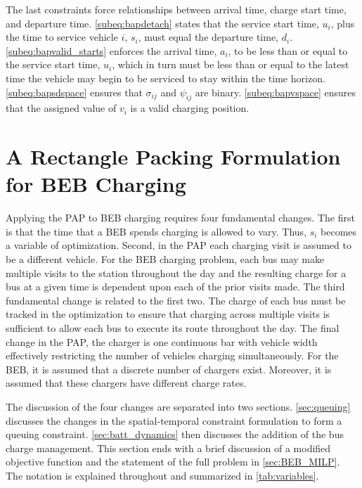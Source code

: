 \documentclass[11pt,a4paper,final]{article}
\begin{document}
The last constraints force relationships between arrival time, charge start time, and departure time.
\autoref{subeq:bapdetach} states that the service start time, \(u_i\), plus the time to service vehicle \(i\), \(s_i\), must
equal the departure time, \(d_i\). \autoref{subeq:bapvalid_starts} enforces the arrival time, \(a_i\), to be less than or
equal to the service start time, \(u_i\), which in turn must be less than or equal to the latest time the vehicle may
begin to be serviced to stay within the time horizon. \autoref{subeq:bapsdspace} ensures that \(\sigma_{ij}\) and
\(\psi_{ij}\) are binary. \autoref{subeq:bapvspace} ensures that the assigned value of \(v_i\) is a valid charging position.
\section{A Rectangle Packing Formulation for BEB Charging}
\label{sec:problemformulation}
Applying the PAP to BEB charging requires four fundamental changes. The first is that the time that a BEB spends
charging is allowed to vary. Thus, \(s_i\) becomes a variable of optimization. Second, in the PAP each charging visit is
assumed to be a different vehicle. For the BEB charging problem, each bus may make multiple visits to the station
throughout the day and the resulting charge for a bus at a given time is dependent upon each of the prior visits made.
The third fundamental change is related to the first two. The charge of each bus must be tracked in
the optimization to ensure that charging across multiple visits is sufficient to allow each bus to execute its route throughout the day.
The final change in the PAP, the charger is one continuous bar with vehicle width effectively restricting the number of vehicles
charging simultaneously. For the BEB, it is assumed that a discrete number of chargers exist. Moreover, it is assumed
that these chargers have different charge rates.

The discussion of the four changes are separated into two sections. \autoref{sec:queuing} discusses the changes in the
spatial-temporal constraint formulation to form a queuing constraint. \autoref{sec:batt_dynamics} then discusses the
addition of the bus charge management. This section ends with a brief discussion of a modified objective function and
the statement of the full problem in \autoref{sec:BEB_MILP}. The notation is explained throughout and summarized in
\autoref{tab:variables}.
\end{document}

